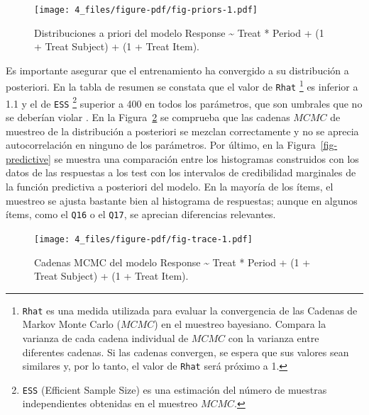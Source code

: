 \documentclass[
  12pt,
  a4paper,
  extrafontsizes,
  onecolumn,
  openright,
  table]{memoir}
\begin{document}
\normalsize

\begin{figure}[h]

{\centering \texttt{[image: 4\_files/figure-pdf/fig-priors-1.pdf]}

}

\caption[Distribuciones a priori del modelo
seleccionado.]{\label{fig-priors}Distribuciones a priori del modelo
Response \textasciitilde{} Treat * Period + (1 + Treat \textbar{}
Subject) + (1 + Treat \textbar{} Item).}

\end{figure}

Es importante asegurar que el entrenamiento ha convergido a su
distribución a posteriori. En la tabla de resumen se constata que el
valor de \texttt{Rhat} \footnote{\texttt{Rhat} es una medida utilizada
  para evaluar la convergencia de las Cadenas de Markov Monte Carlo
  (\(MCMC\)) en el muestreo bayesiano. Compara la varianza de cada
  cadena individual de \(MCMC\) con la varianza entre diferentes
  cadenas. Si las cadenas convergen, se espera que sus valores sean
  similares y, por lo tanto, el valor de \texttt{Rhat} será próximo a 1.}
es inferior a 1.1 y el de \texttt{ESS} \footnote{\texttt{ESS} (Efficient
  Sample Size) es una estimación del número de muestras independientes
  obtenidas en el muestreo \(MCMC\).} superior a 400 en todos los
parámetros, que son umbrales que no se deberían violar
\autocite[ver][]{burkner2019}. En la Figura~\ref{fig-trace} se comprueba
que las cadenas \(MCMC\) de muestreo de la distribución a posteriori se
mezclan correctamente y no se aprecia autocorrelación en ninguno de los
parámetros. Por último, en la Figura~\ref{fig-predictive} se muestra una
comparación entre los histogramas construidos con los datos de las
respuestas a los test con los intervalos de credibilidad marginales de
la función predictiva a posteriori del modelo. En la mayoría de los
ítems, el muestreo se ajusta bastante bien al histograma de respuestas;
aunque en algunos ítems, como el \texttt{Q16} o el \texttt{Q17}, se
aprecian diferencias relevantes.

\begin{figure}[h]

{\centering \texttt{[image: 4\_files/figure-pdf/fig-trace-1.pdf]}

}

\caption[Cadenas MCMC del modelo seleccionado.]{\label{fig-trace}Cadenas
MCMC del modelo Response \textasciitilde{} Treat * Period + (1 + Treat
\textbar{} Subject) + (1 + Treat \textbar{} Item).}

\end{figure}
\end{document}
